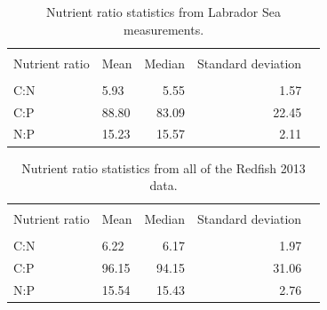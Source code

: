 \documentclass[journal, a4paper]{article} %
\begin{document}
\begin{table}[H] \centering
  \caption{Nutrient ratio statistics from Labrador Sea measurements.}
  \label{t:RFG} 
\begin{tabular}{llrrl}
  \\[-1.8ex]\hline 
\hline \\[-1.8ex] 
Nutrient ratio & Mean & Median & Standard deviation \\ 
\hline \\[-1.8ex] 
C:N & 5.93 & 5.55 & 1.57 \\ 
C:P & 88.80 & 83.09 & 22.45 \\ 
N:P & 15.23 & 15.57 & 2.11 \\ 
   \hline
\end{tabular}
\end{table}

\begin{table}[H] \centering
  \caption{Nutrient ratio statistics from all of the Redfish 2013 data.}
  \label{t:Broad} 
\begin{tabular}{llrrl}
  \\[-1.8ex]\hline 
\hline \\[-1.8ex] 
Nutrient ratio & Mean & Median & Standard deviation \\ 
\hline \\[-1.8ex] 
C:N & 6.22 & 6.17 & 1.97 \\ 
C:P & 96.15 & 94.15 & 31.06 \\ 
N:P & 15.54 & 15.43 & 2.76 \\ 
   \hline
\end{tabular}
\end{table}

\end{document}
